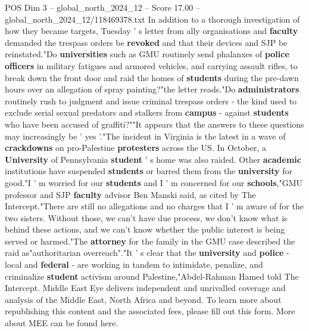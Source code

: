 \begin{textsample}{POS Dim 3 – global\_north\_2024\_12 – Score 17.00 – global\_north\_2024\_12/118469378.txt}
In addition to a thorough investigation of how they became targets, Tuesday ' s letter from ally organisations and \textbf{faculty} demanded the trespass orders be \textbf{revoked} and that their devices and SJP be reinstated."Do \textbf{universities} such as GMU routinely send phalanxes of \textbf{police} \textbf{officers} in military fatigues and armored vehicles, and carrying assault rifles, to break down the front door and raid the homes of \textbf{students} during the pre-dawn hours over an allegation of spray painting?"the letter reads."Do \textbf{administrators} routinely rush to judgment and issue criminal trespass orders - the kind used to exclude serial sexual predators and stalkers from \textbf{campus} - against \textbf{students} who have been accused of graffiti?""It appears that the answers to these questions may increasingly be ' yes '."The incident in Virginia is the latest in a wave of \textbf{crackdowns} on pro-Palestine \textbf{protesters} across the US.
In October, a \textbf{University} of Pennsylvania \textbf{student} ' s home was also raided.
Other \textbf{academic} institutions have suspended \textbf{students} or barred them from the \textbf{university} for good."I ' m worried for our \textbf{students} and I ' m concerned for our \textbf{schools},"GMU professor and SJP \textbf{faculty} advisor Ben Manski said, as cited by The Intercept."There are still no allegations and no charges that I ' m aware of for the two sisters.
Without those, we can't have due process, we don't know what is behind these actions, and we can't know whether the public interest is being served or harmed."The \textbf{attorney} for the family in the GMU case described the raid as"authoritarian overreach"."It ' s clear that the \textbf{university} and \textbf{police} - local and \textbf{federal} - are working in tandem to intimidate, penalize, and criminalize \textbf{student} activism around Palestine,"Abdel-Rahman Hamed told The Intercept.
Middle East Eye delivers independent and unrivalled coverage and analysis of the Middle East, North Africa and beyond.
To learn more about republishing this content and the associated fees, please fill out this form.
More about MEE can be found here.

\end{textsample}
